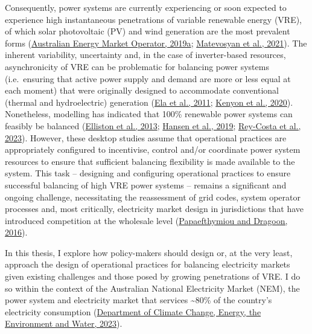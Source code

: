 \documentclass[12pt,a4paper,]{report}
\begin{document}
Consequently, power systems are currently experiencing or soon expected
to experience high instantaneous penetrations of variable renewable
energy (VRE), of which solar photovoltaic (PV) and wind generation are
the most prevalent forms
(\protect\hyperlink{ref-australianenergymarketoperatorMaintainingPowerSystem2019}{Australian
Energy Market Operator, 2019a};
\protect\hyperlink{ref-matevosyanFutureInverterBasedResources2021}{Matevosyan
et al., 2021}). The inherent variability, uncertainty and, in the case
of inverter-based resources, asynchronicity of VRE can be problematic
for balancing power systems (i.e.~ensuring that active power supply and
demand are more or less equal at each moment) that were originally
designed to accommodate conventional (thermal and hydroelectric)
generation (\protect\hyperlink{ref-elaOperatingReservesVariable2011}{Ela
et al., 2011};
\protect\hyperlink{ref-kenyonStabilityControlPower2020}{Kenyon et al.,
2020}). Nonetheless, modelling has indicated that 100\% renewable power
systems can feasibly be balanced
(\protect\hyperlink{ref-ellistonLeastCost1002013}{Elliston et al.,
2013}; \protect\hyperlink{ref-hansenStatusPerspectives1002019}{Hansen et
al., 2019};
\protect\hyperlink{ref-rey-costaFirming100Renewable2023}{Rey-Costa et
al., 2023}). However, these desktop studies assume that operational
practices are appropriately configured to incentivise, control and/or
coordinate power system resources to ensure that sufficient balancing
flexibility is made available to the system. This task -- designing and
configuring operational practices to ensure successful balancing of high
VRE power systems -- remains a significant and ongoing challenge,
necessitating the reassessment of grid codes, system operator processes
and, most critically, electricity market design in jurisdictions that
have introduced competition at the wholesale level
(\protect\hyperlink{ref-papaefthymiou100RenewableEnergy2016}{Papaefthymiou
and Dragoon, 2016}).

In this thesis, I explore how policy-makers should design or, at the
very least, approach the design of operational practices for balancing
electricity markets given existing challenges and those posed by growing
penetrations of VRE. I do so within the context of the Australian
National Electricity Market (NEM), the power system and electricity
market that services \textasciitilde80\% of the country's electricity
consumption
(\protect\hyperlink{ref-departmentofclimatechangeenergytheenvironmentandwaterNationalElectricityMarket2023}{Department
of Climate Change, Energy, the Environment and Water, 2023}).
\end{document}
